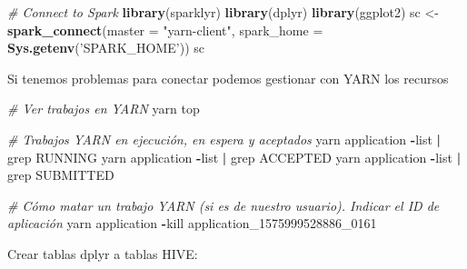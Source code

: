 \documentclass[]{book}
\newenvironment{Shaded}{\begin{snugshade}}{\end{snugshade}}
\newcommand{\CommentTok}[1]{\textcolor[rgb]{0.56,0.35,0.01}{\textit{#1}}}
\newcommand{\DataTypeTok}[1]{\textcolor[rgb]{0.13,0.29,0.53}{#1}}
\newcommand{\DecValTok}[1]{\textcolor[rgb]{0.00,0.00,0.81}{#1}}
\newcommand{\KeywordTok}[1]{\textcolor[rgb]{0.13,0.29,0.53}{\textbf{#1}}}
\newcommand{\NormalTok}[1]{#1}
\newcommand{\OperatorTok}[1]{\textcolor[rgb]{0.81,0.36,0.00}{\textbf{#1}}}
\newcommand{\OtherTok}[1]{\textcolor[rgb]{0.56,0.35,0.01}{#1}}
\newcommand{\StringTok}[1]{\textcolor[rgb]{0.31,0.60,0.02}{#1}}
\begin{document}
\begin{Shaded}
\begin{Highlighting}[]
\CommentTok{# Connect to Spark}
\KeywordTok{library}\NormalTok{(sparklyr)}
\KeywordTok{library}\NormalTok{(dplyr)}
\KeywordTok{library}\NormalTok{(ggplot2)}
\NormalTok{sc <-}\StringTok{ }\KeywordTok{spark_connect}\NormalTok{(}\DataTypeTok{master =} \StringTok{"yarn-client"}\NormalTok{, }\DataTypeTok{spark_home =} \KeywordTok{Sys.getenv}\NormalTok{(}\StringTok{'SPARK_HOME'}\NormalTok{)) }
\NormalTok{sc}
\end{Highlighting}
\end{Shaded}

Si tenemos problemas para conectar podemos gestionar con YARN los recursos

\begin{Shaded}
\begin{Highlighting}[]
\CommentTok{# Ver trabajos en YARN}
\NormalTok{yarn top}

\CommentTok{# Trabajos YARN en ejecución, en espera y aceptados}
\NormalTok{yarn application }\OperatorTok{-}\NormalTok{list }\OperatorTok{|}\StringTok{ }\NormalTok{grep RUNNING}
\NormalTok{yarn application }\OperatorTok{-}\NormalTok{list }\OperatorTok{|}\StringTok{ }\NormalTok{grep ACCEPTED}
\NormalTok{yarn application }\OperatorTok{-}\NormalTok{list }\OperatorTok{|}\StringTok{ }\NormalTok{grep SUBMITTED}

\CommentTok{# Cómo matar un trabajo YARN (si es de nuestro usuario). Indicar el ID de aplicación}
\NormalTok{yarn application }\OperatorTok{-}\NormalTok{kill application_}\DecValTok{1575999528886}\NormalTok{_}\DecValTok{0161}
\end{Highlighting}
\end{Shaded}

Crear tablas dplyr a tablas HIVE:

\begin{Shaded}
\end{Shaded}

\begin{Shaded}
\end{Shaded}
\end{document}
